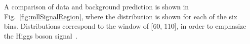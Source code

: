 A comparison of data and background prediction is shown in
Fig.~\ref{fig:mllSignalRegion}, where the \mll{} distribution is shown for each of the six \pth{} bins. Distributions correspond to the \mt{} window of [60, 110]\GeV, in order to emphasize the Higgs boson signal~\cite{Chatrchyan:2013iaa}.

\begin{figure}[!htbp]
\centering
{}
\\
\end{figure}
